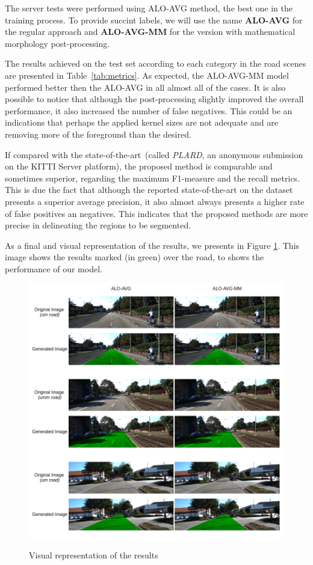 The server tests were performed using ALO-AVG method, the best one in the training process. To provide succint labels, we will use the name \textbf{ALO-AVG} for the regular approach and \textbf{ALO-AVG-MM} for the version with mathematical morphology post-processing. 

The results achieved  on the test set according to each category in the road scenes are presented in Table~\ref{tab:metrics}. As expected, the ALO-AVG-MM model performed better then the ALO-AVG in all almost all of the cases. {\color{red}It is also possible to notice that although the post-processing slightly improved the overall performance, it also increased the number of false negatives. This could be an indications that perhaps the applied kernel sizes are not adequate and are removing more of the foreground than the desired.}

If compared with the state-of-the-art~(called \textit{PLARD}, an anonymous submission on the KITTI Server platform), the proposed method is comparable and sometimes superior, regarding the maximum F1-measure and the recall metrics. This is due the fact that although the reported state-of-the-art on the dataset presents a superior average precision, it also almost always presents a higher rate of false positives an negatives. This indicates that the proposed methods are more precise in delineating the regions to be segmented.



As a final and visual representation of the results, we presents in Figure \ref{fig:visual_representation}. This image shows the results marked (in green) over the road, to shows the performance of our model.

\begin{figure}
  \caption{Visual representation of the results}
  \centering
  \includegraphics[width=1.\columnwidth]{figures/falreis/visual_representation.png}
  \label{fig:visual_representation}
\end{figure}
